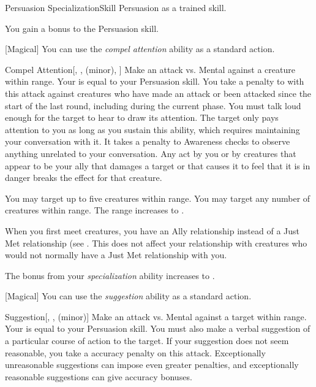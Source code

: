     \begin{feat}{Persuasion Specialization}{Skill}
        \featpre Persuasion as a trained skill.

         You gain a  bonus to the Persuasion skill.

        [Magical] You can use the \textit{compel attention} ability as a standard action.
        \begin{freeability}{Compel Attention}[, ,  (minor), ]
            Make an attack vs. Mental against a creature within \rngmed range.
            Your  is equal to your Persuasion skill.
            You take a  penalty to  with this attack against creatures who have made an attack or been attacked since the start of the last round, including during the current phase.
            You must talk loud enough for the target to hear to draw its attention.
            \hit The target only pays attention to you as long as you sustain this ability, which requires maintaining your conversation with it.
            It takes a  penalty to Awareness checks to observe anything unrelated to your conversation.
            Any act by you or by creatures that appear to be your ally that damages a target or that causes it to feel that it is in danger breaks the effect for that creature.

            \rankline
             You may target up to five creatures within range.
             You may target any number of creatures within range.
             The range increases to \distrange.
        \end{freeability}

         When you first meet creatures, you have an Ally relationship instead of a Just Met relationship (see .
        This does not affect your relationship with creatures who would not normally have a Just Met relationship with you.

         The bonus from your \textit{specialization} ability increases to .

        [Magical] You can use the \textit{suggestion} ability as a standard action.
        \begin{freeability}{Suggestion}[, ,  (minor)]
            Make an attack vs. Mental against a target within \rngmed range.
            Your  is equal to your Persuasion skill.
            You must also make a verbal suggestion of a particular course of action to the target.
            If your suggestion does not seem reasonable, you take a  accuracy penalty on this attack.
            Exceptionally unreasonable suggestions can impose even greater penalties, and exceptionally reasonable suggestions can give accuracy bonuses.


\end{freeability}
\end{feat}
